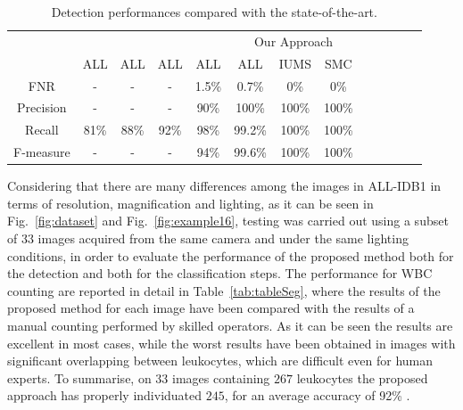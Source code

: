 \documentclass[final,a4paper,12pt,english]{UnicaPhdThesis3}
\begin{document}
	\begin{table}[!b]
		\caption{Detection performances compared with the state-of-the-art.}
		\centering\tabcolsep=2mm
		\begin{tabular}{c  ccc ccc ccc ccc}
			\hline
			& \cite{Mahmood}	& \cite{Alilou} & \cite{Put14b}	& \cite{Alomari} & \multicolumn{3}{c}{Our Approach}\\
			&  	ALL  						&  ALL  					& 	ALL  				& 	ALL   					&   ALL  		&	IUMS 		& SMC \\
			\hline
			FNR			& 	- 							& 	- 				 	&	-					&	1.5\% 					&	0.7\% 	& 	0\% 		& 	0\% \\
			Precision 	&	-							& 	- 					&	- 					&	90\% 					&	100\% 	& 	100\% 		& 	100\% \\
			Recall		& 	81\% 						&  	88\% 				& 	92\% 				& 	98\% 					&	99.2\% 	& 	100\% 		& 	100\% \\
			F-measure 	& 	- 							&  	- 					& 	-					& 	94\% 					&    99.6\% 	& 	100\% 		& 	100\% \\
			\hline
		\end{tabular} 
		\label{tab:table_count}
	\end{table}
	
	Considering that there are many differences among the images in ALL-IDB1 in terms of resolution, magnification and lighting, as it can be seen in Fig.~\ref{fig:dataset} and Fig.~\ref{fig:example16}, testing was carried out using a subset of $33$ images acquired from the same camera and under the same lighting conditions, in order to evaluate the performance of the proposed method  both for the detection and both for the classification steps. The  performance for WBC counting are reported in detail in Table~\ref{tab:tableSeg}, where the results of the proposed method for each image have been compared with the results of a manual counting performed by skilled operators. As it can be seen the results are excellent in most cases, while the worst results have been obtained in images with significant overlapping between leukocytes, which are difficult even for human experts. To summarise, on $33$ images containing $267$ leukocytes the proposed approach has properly individuated $245$, for an  average  accuracy  of 92\% . 
	
\end{document}
